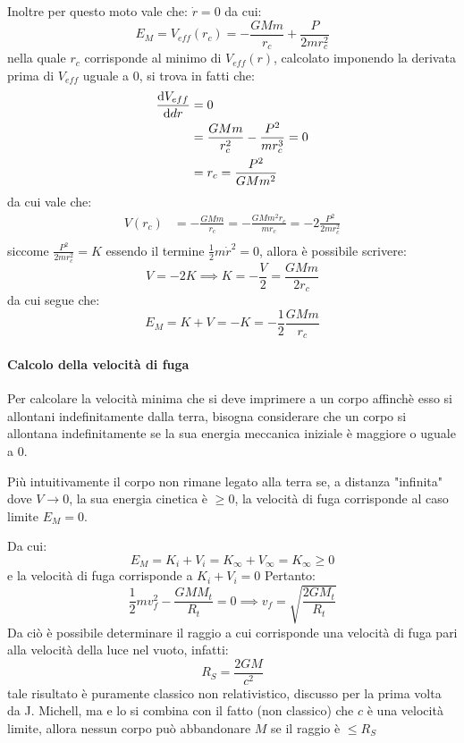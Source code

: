 \documentclass[11pt, a4paper, openright]{book}
\theoremstyle{plain}
\theoremstyle{definition}
\begin{document}
Inoltre per questo moto vale che: $\dot{r} = 0$ da cui:
\begin{equation}
    E_M = V_{eff}(r_c) = -\frac{GMm}{r_c} + \frac{P}{2mr_c^2}
\end{equation}
nella quale $r_c$ corrisponde al minimo di $V_{eff}(r)$, calcolato imponendo la derivata prima di $V_{eff}$ uguale a 0, si trova in fatti che:
\begin{align}
    \dv{V_{eff}}{dr} & = 0 \\
                     & = \frac{GMm}{r_c^2} - \frac{P^2}{mr_c^3} = 0 \\
                     & = r_c = \frac{P^2}{GMm^2}
\end{align}
da cui vale che:
\begin{align}
    V(r_c) & = - \frac{GMm}{r_c} = - \frac{GMm^2r_c}{mr_c} = - 2 \frac{P^2}{2mr_c^2}\\
\end{align}
siccome $\frac{P^2}{2mr_c^2} = K$ essendo il termine $\frac{1}{2}m\dot{r}^2 = 0$, allora è possibile scrivere:
\begin{equation}
    V = -2K \implies K = -\frac{V}{2} = \frac{GMm}{2r_c}
\end{equation}
da cui segue che:
\begin{equation}
    E_M = K + V = - K = - \frac{1}{2}\frac{GMm}{r_c}
\end{equation}

\paragraph{Calcolo della velocità di fuga}
Per calcolare la velocità minima che si deve imprimere a un corpo affinchè esso si allontani indefinitamente dalla terra, bisogna considerare che un corpo si allontana indefinitamente se la sua energia meccanica iniziale è maggiore o uguale a 0.

Più intuitivamente il corpo non rimane legato alla terra se, a distanza "infinita" dove $V \to 0$, la sua energia cinetica è $\geq 0 $, la velocità di fuga corrisponde al caso limite $E_M = 0$.

Da cui:
\begin{equation}
    E_M = K_i + V_i = K_\infty + V_\infty = K_\infty \geq 0
\end{equation}
e la velocità di fuga corrisponde a $K_i + V_i = 0$
Pertanto:
\begin{equation}
    \frac{1}{2}mv^2_f - \frac{GMM_t}{R_t} = 0 \implies v_f = \sqrt{\frac{2GM_t}{R_t}}
\end{equation}
Da ciò è possibile determinare il raggio a cui corrisponde una velocità di fuga pari alla velocità della luce nel vuoto, infatti:
\begin{equation}
    R_S = \frac{2GM}{c^2}
\end{equation}
tale risultato è puramente classico non relativistico, discusso per la prima volta da J. Michell, ma e lo si combina con il fatto (non classico) che $c$ è una velocità limite, allora nessun corpo può abbandonare $M$ se il raggio è $\leq R_S$
\end{document}
